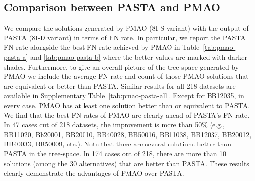 \subsection{Comparison between PASTA and PMAO}
We compare the solutions generated by PMAO (8I-S variant) with the output of PASTA (8I-D variant) in terms of FN rate. In particular, we report the PASTA FN rate  alongside the best FN rate achieved by PMAO in Table~\ref{tab:pmao-pasta-a} and \ref{tab:pmao-pasta-b} where the better values are marked with darker shades. Furthermore, to give an overall picture of the tree-space generated by PMAO we include the average FN rate and count of those PMAO solutions that are equivalent or better than PASTA. Similar results for all 218 datasets are available in Supplementary Table~\ref{tab:pmao-pasta-all}. Except for BB12035, in every case, PMAO has at least one solution better than or equivalent to PASTA. We find that the best FN rates of PMAO are clearly ahead of PASTA's FN rate. In 47 cases out of 218 datasets, the improvement is more than 50\% (e.g., BB11020, Bb20001, BB20010, BB40028, BB50016, BB11038, BB12037, BB20012, BB40033, BB50009, etc.). Note that there are several solutions better than PASTA in the tree-space. In 174 cases out of 218, there are more than 10 solutions (among the 30 alternatives) that are better than PASTA. These results clearly demonstrate the advantages of PMAO over PASTA. 
